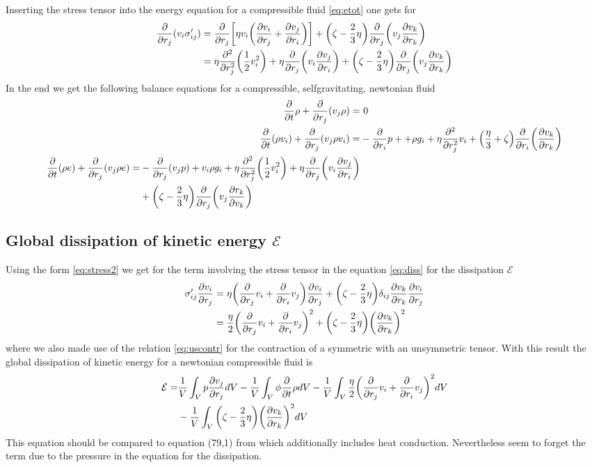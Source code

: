 Inserting the stress tensor into the energy equation for a compressible fluid
\eqref{eq:etot} one gets for
\begin{align}
\begin{split}
\pd{r_j}(v_i \sigma'_{ij}) 
&=\pd{r_j}\lrb{\eta v_i \lra{\ppd{r_j}{v_i}+\ppd{r_i}{v_j}}}
+\lra{\zeta-\frac{2}{3}\eta}\pd{r_j}\lra{v_j \ppd{r_k}{v_k}}\\
&=\eta \pdd{r_j}\lra{\frac{1}{2}v_i^2}+\eta \pd{r_j}\lra{v_i\ppd{r_i}{v_j}}
+\lra{\zeta-\frac{2}{3}\eta}\pd{r_j}\lra{v_j \ppd{r_k}{v_k}}
\end{split}
\end{align}
In the end we get the following balance equations for a compressible, 
selfgravitating, newtonian fluid
\begin{align}
\pd{t}\rho + \pd{r_j}(v_j \rho) =&\ 0 \\
\pd{t}(\rho v_i) + \pd{r_j}(v_j \rho v_i) =& -\pd{r_i}p + +\rho g_i
+\eta\pdd{r_j}v_i
+\lra{\frac{\eta}{3}+\zeta}\pd{r_i}\lra{\ppd{r_k}{v_k}}\\
\begin{split}
\pd{t}(\rho e) + \pd{r_j}(v_j \rho e) =& -\pd{r_j}(v_j p) + v_i \rho g_i 
+\eta \pdd{r_j}\lra{\frac{1}{2}v_i^2}+ \eta \pd{r_j}\lra{v_i\ppd{r_i}{v_j}} \\
&+\lra{\zeta-\frac{2}{3}\eta} \pd{r_j}\lra{v_j\ppd{v_k}{r_k}}
\end{split}
\end{align}

\subsection{Global dissipation of kinetic energy $\mathcal{E}$}
Using the form \eqref{eq:stress2} we get for the term involving the stress
tensor in the equation \eqref{eq:diss} for the dissipation $\mathcal{E}$
\begin{align}
\begin{split}
\sigma'_{ij}\ppd{r_j}{v_i} 
&= \eta\lra{\pd{r_j}v_i+\pd{r_i}v_j}\ppd{r_j}{v_i}
+ \lra{\zeta-\frac{2}{3}\eta}\delta_{ij}\ppd{r_k}{v_k}\ppd{r_j}{v_i}\\
&=\frac{\eta}{2}\lra{\pd{r_j}v_i+\pd{r_i}v_j}^2
+\lra{\zeta-\frac{2}{3}\eta}\lra{\ppd{r_k}{v_k}}^2
\end{split}
\end{align}
where we also made use of the relation \eqref{eq:uscontr} for the contraction of
a symmetric with an unsymmetric tensor. With this result the global dissipation
of kinetic energy for a newtonian compressible fluid is
\begin{align}
\begin{split}
\mathcal{E} =& 
\frac{1}{V} \int_V p \ppd{r_j}{v_j} dV
-\frac{1}{V} \int_V \phi \pd{t}\rho dV
-\frac{1}{V} \int_V \frac{\eta}{2}\lra{\pd{r_j}v_i+\pd{r_i}v_j}^2 dV\\
&-\frac{1}{V} \int_V \lra{\zeta-\frac{2}{3}\eta}\lra{\ppd{r_k}{v_k}}^2 dV
\end{split}
\end{align}
This equation should be compared to equation (79,1) from \citet{Landau1991}
which additionally includes heat conduction. Nevertheless \citet{Landau1991}
seem to forget the term due to the pressure in the equation for the
dissipation.

